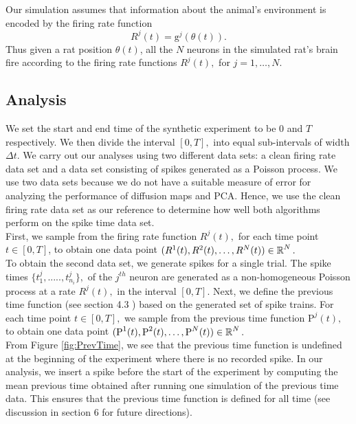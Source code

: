 Our simulation assumes  that information about the animal's environment is  encoded by the firing rate function
$$R^{j}(t) =  \text{g}^{j}(\theta(t)).$$
Thus given a rat position $\theta(t)$, all the $N$ neurons  in the simulated rat's brain fire according to the firing rate functions  $R^{j}(t),$ for $j = 1, \ldots, N.$


\subsection{Analysis}
We set the start  and end time of the synthetic experiment  to be  $0$ and $T$ respectively. We then divide the interval
$[0, T],$ into equal sub-intervals  of width $\Delta t$.
We carry out  our analyses  using two different data sets:  a clean firing rate data set and a data set consisting of spikes generated as a Poisson process.
We use two data sets because we do not have a suitable measure of error for analyzing the performance of diffusion maps
and PCA. Hence, we use the clean firing rate data set as our reference to determine how well both algorithms perform
on the spike time data set.\\

First, we sample from the firing rate function  $R^{j}(t),$ for each time point $t \in [0, T]$,
to obtain one data point  $(R^{1}(t),  R^{2}(t),    \ldots , R^{N}(t) )  \in \operatorname{\mathbb{R}}^N.$ \\

To obtain the second data set, we generate spikes  for a single trial. The spike times $\{t_{1}^{j}, ....., t_{n_{i}}^{j} \},$  of the $j^{th}$ neuron are generated as a non-homogeneous Poisson process at a rate $R^{j}(t),$ in the interval $[0, T].$
Next, we define the previous time function (see section 4.3 )  based on the  generated set of  spike trains.  
For each time point $t \in [0, T],$ we sample from the previous time function $\text{P}^{j}(t),$ to obtain  one data point
$( \text{P}^{1}(t), \text{P}^{2}(t), \ldots, \text{P}^{N}(t) ) \in  \operatorname{\mathbb{R}}^N.$ \\

From Figure \ref{fig:PrevTime}, we  see that the previous time function is undefined at the beginning of the experiment where there is no recorded spike. In our analysis, we insert a spike before the start of the experiment by computing the mean previous time obtained after running  one simulation of  the previous time data. This ensures that the previous time function
is defined for all time (see discussion in section 6 for future directions). \\

